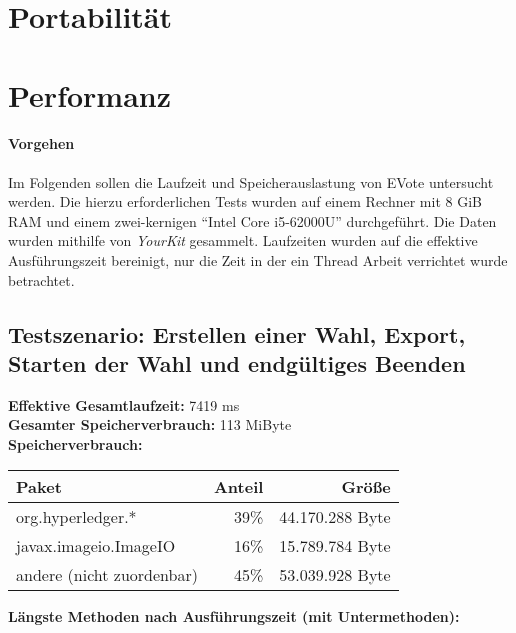 \documentclass[parskip=full]{scrartcl}
\begin{document}
\section{Portabilität}
\newpage
\section{Performanz}
\paragraph{Vorgehen}
Im Folgenden sollen die Laufzeit und Speicherauslastung von EVote untersucht werden.
Die hierzu erforderlichen Tests wurden auf einem Rechner mit 8 GiB RAM und einem zwei-kernigen \enquote{Intel Core i5-62000U} durchgeführt. Die Daten wurden mithilfe von \textit{YourKit} gesammelt. Laufzeiten wurden auf die effektive Ausführungszeit bereinigt, nur die Zeit in der ein Thread Arbeit verrichtet wurde betrachtet.
\subsection{Testszenario: Erstellen einer Wahl, Export, Starten der Wahl und endgültiges Beenden}
\textbf{Effektive Gesamtlaufzeit:} 7419 ms\\
\textbf{Gesamter Speicherverbrauch:} 113 MiByte \\
\textbf{Speicherverbrauch:}

\begin{table}[h!]
	\begin{tabular}[t]{l r r}
		Paket & Anteil & Größe \\ \hline
		org.hyperledger.* & 39\% & 44.170.288 Byte \\
		javax.imageio.ImageIO & 16\% & 15.789.784 Byte \\
		andere (nicht zuordenbar) & 45\% & 53.039.928 Byte \\
	\end{tabular}
\end{table}
\textbf{Längste Methoden nach Ausführungszeit (mit Untermethoden):}
\end{document}
